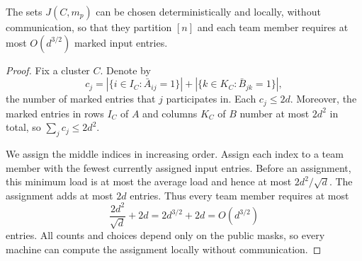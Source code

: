 \begin{lemma}\label{lem:greedy-assignment}
	The sets $J(C,m_p)$ can be chosen deterministically and locally,
	without communication, so that they partition $[n]$ and each
	team member requires at most $O(d^{3/2})$ marked input entries.
\end{lemma}
\begin{proof}
	Fix a cluster $C$. Denote by
	\[
	  c_j=
	  |\{i\in I_C:\bar A_{ij}=1\}|
	  +|\{k\in K_C:\bar B_{jk}=1\}|,
	\]
	the number of marked entries that $j$ participates in. Each $c_j\le 2d$. Moreover, the marked entries in rows $I_C$
	of $A$ and columns $K_C$ of $B$ number at most $2d^2$ in total,
	so $\sum_j c_j\le 2d^2$.

	We assign the middle indices in increasing order. Assign each
	index to a team member with the fewest currently assigned
	input entries. Before an
	assignment, this minimum load is at most the average load
	and hence at most $2d^2/\sqrt d$. The assignment adds at most
	$2d$ entries. Thus every team member requires at most
	\[
	  \frac{2d^2}{\sqrt d}+2d=2d^{3/2}+2d = O(d^{3/2})
	\]
	entries. All counts and choices depend only on
	the public masks, so every machine can compute the assignment
	locally without communication.
\end{proof}



